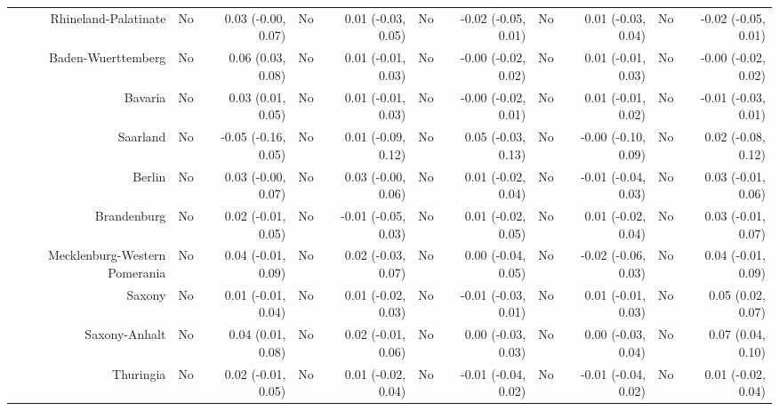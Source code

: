 \documentclass[
  man,floatsintext]{apa6}
\newenvironment{lltable}{\begin{landscape}\centering\begin{ThreePartTable}}{\end{ThreePartTable}\end{landscape}}
\begin{document}
\begin{lltable}
{\begin{longtable}{rrrrrrrrrrr}
Rhineland-Palatinate & No & 0.03 (-0.00, 0.07) & No & 0.01 (-0.03, 0.05) & No & -0.02 (-0.05, 0.01) & No & 0.01 (-0.03, 0.04) & No & -0.02 (-0.05, 0.01)\\
Baden-Wuerttemberg & No & 0.06 (0.03, 0.08) & No & 0.01 (-0.01, 0.03) & No & -0.00 (-0.02, 0.02) & No & 0.01 (-0.01, 0.03) & No & -0.00 (-0.02, 0.02)\\
Bavaria & No & 0.03 (0.01, 0.05) & No & 0.01 (-0.01, 0.03) & No & -0.00 (-0.02, 0.01) & No & 0.01 (-0.01, 0.02) & No & -0.01 (-0.03, 0.01)\\
Saarland & No & -0.05 (-0.16, 0.05) & No & 0.01 (-0.09, 0.12) & No & 0.05 (-0.03, 0.13) & No & -0.00 (-0.10, 0.09) & No & 0.02 (-0.08, 0.12)\\
Berlin & No & 0.03 (-0.00, 0.07) & No & 0.03 (-0.00, 0.06) & No & 0.01 (-0.02, 0.04) & No & -0.01 (-0.04, 0.03) & No & 0.03 (-0.01, 0.06)\\
Brandenburg & No & 0.02 (-0.01, 0.05) & No & -0.01 (-0.05, 0.03) & No & 0.01 (-0.02, 0.05) & No & 0.01 (-0.02, 0.04) & No & 0.03 (-0.01, 0.07)\\
Mecklenburg-Western Pomerania & No & 0.04 (-0.01, 0.09) & No & 0.02 (-0.03, 0.07) & No & 0.00 (-0.04, 0.05) & No & -0.02 (-0.06, 0.03) & No & 0.04 (-0.01, 0.09)\\
Saxony & No & 0.01 (-0.01, 0.04) & No & 0.01 (-0.02, 0.03) & No & -0.01 (-0.03, 0.01) & No & 0.01 (-0.01, 0.03) & No & 0.05 (0.02, 0.07)\\
Saxony-Anhalt & No & 0.04 (0.01, 0.08) & No & 0.02 (-0.01, 0.06) & No & 0.00 (-0.03, 0.03) & No & 0.00 (-0.03, 0.04) & No & 0.07 (0.04, 0.10)\\
Thuringia & No & 0.02 (-0.01, 0.05) & No & 0.01 (-0.02, 0.04) & No & -0.01 (-0.04, 0.02) & No & -0.01 (-0.04, 0.02) & No & 0.01 (-0.02, 0.04)\\
\bottomrule
\end{longtable}

}

\end{lltable}
\end{document}
